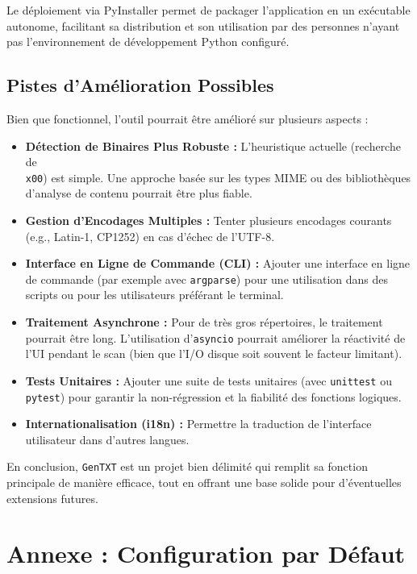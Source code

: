 \documentclass[11pt, a4paper]{article}
\begin{document}
Le déploiement via PyInstaller permet de packager l'application en un exécutable autonome, facilitant sa distribution et son utilisation par des personnes n'ayant pas l'environnement de développement Python configuré.

\subsection{Pistes d'Amélioration Possibles}
Bien que fonctionnel, l'outil pourrait être amélioré sur plusieurs aspects :
\begin{itemize}
    \item \textbf{Détection de Binaires Plus Robuste :} L'heuristique actuelle (recherche de \texttt{\\x00}) est simple. Une approche basée sur les types MIME ou des bibliothèques d'analyse de contenu pourrait être plus fiable.
    \item \textbf{Gestion d'Encodages Multiples :} Tenter plusieurs encodages courants (e.g., Latin-1, CP1252) en cas d'échec de l'UTF-8.
    \item \textbf{Interface en Ligne de Commande (CLI) :} Ajouter une interface en ligne de commande (par exemple avec \texttt{argparse}) pour une utilisation dans des scripts ou pour les utilisateurs préférant le terminal.
    \item \textbf{Traitement Asynchrone :} Pour de très gros répertoires, le traitement pourrait être long. L'utilisation d'\texttt{asyncio} pourrait améliorer la réactivité de l'UI pendant le scan (bien que l'I/O disque soit souvent le facteur limitant).
    \item \textbf{Tests Unitaires :} Ajouter une suite de tests unitaires (avec \texttt{unittest} ou \texttt{pytest}) pour garantir la non-régression et la fiabilité des fonctions logiques.
    \item \textbf{Internationalisation (i18n) :} Permettre la traduction de l'interface utilisateur dans d'autres langues.
\end{itemize}

En conclusion, \texttt{GenTXT} est un projet bien délimité qui remplit sa fonction principale de manière efficace, tout en offrant une base solide pour d'éventuelles extensions futures.

\appendix
\section{Annexe : Configuration par Défaut}
\label{annexe:config}
\end{document}
